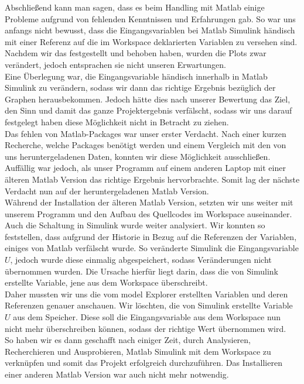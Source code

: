 \label{Fazit}

Abschließend kann man sagen, dass es beim Handling mit Matlab einige Probleme aufgrund von fehlenden Kenntnissen und Erfahrungen gab. So war uns anfangs nicht bewusst, dass die Eingangsvariablen bei Matlab Simulink händisch mit einer Referenz auf die im Workspace deklarierten Variablen zu versehen sind. Nachdem wir das festgestellt und behoben haben, wurden die Plots zwar verändert, jedoch entsprachen sie nicht unseren Erwartungen. \\
Eine Überlegung war, die Eingangsvariable händisch innerhalb in Matlab Simulink zu verändern, sodass wir dann das richtige Ergebnis bezüglich der Graphen herausbekommen. Jedoch hätte dies nach unserer Bewertung das Ziel, den Sinn und damit das ganze Projektergebnis verfälscht, sodass wir uns darauf festgelegt haben diese Möglichkeit nicht in Betracht zu ziehen. \\
Das fehlen von Matlab-Packages war unser erster Verdacht. Nach einer kurzen Recherche, welche Packages benötigt werden und einem Vergleich mit den von uns heruntergeladenen Daten, konnten wir diese Möglichkeit ausschließen. \\
Auffällig war jedoch, als unser Programm auf einem anderen Laptop mit einer älteren Matlab Version das richtige Ergebnis hervorbrachte. Somit lag der nächste Verdacht nun auf der heruntergeladenen Matlab Version. \\
Während der Installation der älteren Matlab Version, setzten wir uns weiter mit unserem Programm und den Aufbau des Quellcodes im Workspace auseinander. Auch die Schaltung in Simulink wurde weiter analysiert. Wir konnten so feststellen, dass aufgrund der Historie in Bezug auf die Referenzen der Variablen, einiges von Matlab verfälscht wurde. So veränderte Simulink die Eingangsvariable $U$, jedoch wurde diese einmalig abgespeichert, sodass Veränderungen nicht übernommen wurden. Die Ursache hierfür liegt darin, dass die von Simulink erstellte Variable, jene aus dem Workspace überschreibt. \\
Daher mussten wir uns die vom model Explorer erstellten Variablen und deren Referenzen genauer anschauen. Wir löschten, die von Simulink erstellte Variable $U$ aus dem Speicher. Diese soll die Eingangsvariable aus dem Workspace nun nicht mehr überschreiben können, sodass der richtige Wert übernommen wird. \\
So haben wir es dann geschafft nach einiger Zeit, durch Analysieren, Recherchieren und Ausprobieren, Matlab Simulink mit dem Workspace zu verknüpfen und somit das Projekt erfolgreich durchzuführen. Das Installieren einer anderen Matlab Version war auch nicht mehr notwendig. \\